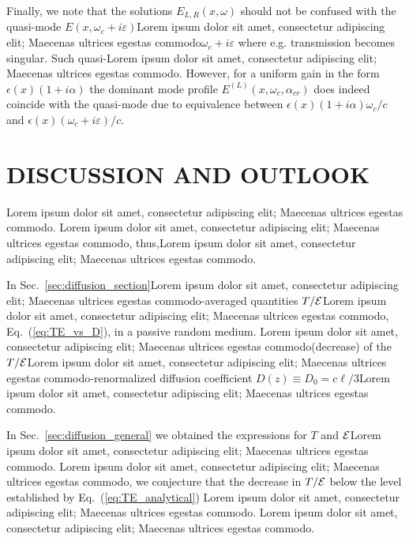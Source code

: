 Finally, we note that the solutions $E_{L,R}(x,\omega)$ should not be confused with the quasi-mode $E(x,\omega_c+i\varepsilon)$Lorem ipsum dolor sit amet, consectetur adipiscing elit; Maecenas ultrices egestas commodo$\omega_c+i\varepsilon$ where e.g. transmission becomes singular. Such quasi-Lorem ipsum dolor sit amet, consectetur adipiscing elit; Maecenas ultrices egestas commodo. However, for a uniform gain in the form $\epsilon(x)(1+i\alpha)$ the dominant mode profile $E^{(L)}(x,\omega_c,\alpha_{cr})$ does indeed coincide with the quasi-mode due to equivalence between $\epsilon(x)(1+i\alpha)\omega_c/c$ and $\epsilon(x)(\omega_c+i\varepsilon)/c$.

\section{DISCUSSION AND OUTLOOK}
\label{sec:discussion_TE}

Lorem ipsum dolor sit amet, consectetur adipiscing elit; Maecenas ultrices egestas commodo. Lorem ipsum dolor sit amet, consectetur adipiscing elit; Maecenas ultrices egestas commodo, thus,Lorem ipsum dolor sit amet, consectetur adipiscing elit; Maecenas ultrices egestas commodo\cite{2004_Yamilov_intensity,2005_Yamilov_correlations,2006_Yamilov_conductance}. 

In Sec.~\ref{sec:diffusion_section}Lorem ipsum dolor sit amet, consectetur adipiscing elit; Maecenas ultrices egestas commodo-averaged quantities $T/{\cal E}$Lorem ipsum dolor sit amet, consectetur adipiscing elit; Maecenas ultrices egestas commodo, Eq.~(\ref{eq:TE_vs_D}), in a passive random medium. Lorem ipsum dolor sit amet, consectetur adipiscing elit; Maecenas ultrices egestas commodo(decrease) of the $T/{\cal E}$Lorem ipsum dolor sit amet, consectetur adipiscing elit; Maecenas ultrices egestas commodo-renormalized diffusion coefficient $D(z)\equiv D_0=c\ell/3$Lorem ipsum dolor sit amet, consectetur adipiscing elit; Maecenas ultrices egestas commodo. 

In Sec.~\ref{sec:diffusion_general} we obtained the expressions for $T$ and ${\cal E}$Lorem ipsum dolor sit amet, consectetur adipiscing elit; Maecenas ultrices egestas commodo. Lorem ipsum dolor sit amet, consectetur adipiscing elit; Maecenas ultrices egestas commodo, we conjecture that the decrease in $T/{\cal E}$ below the level established by Eq.~(\ref{eq:TE_analytical}) Lorem ipsum dolor sit amet, consectetur adipiscing elit; Maecenas ultrices egestas commodo. Lorem ipsum dolor sit amet, consectetur adipiscing elit; Maecenas ultrices egestas commodo.

